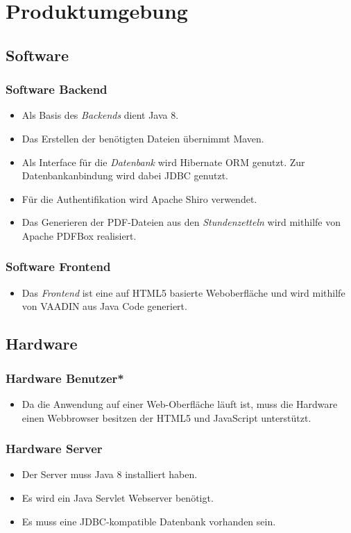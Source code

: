\section{Produktumgebung}

\subsection{Software}
\subsubsection{Software Backend}
\begin{itemize}
    \item Als Basis des \emph{Backends} dient Java 8.
    \item Das Erstellen der benötigten Dateien übernimmt Maven.
    \item Als Interface für die \emph{Datenbank} wird Hibernate ORM genutzt.
            Zur Datenbankanbindung wird dabei JDBC genutzt.
    \item Für die Authentifikation wird Apache Shiro verwendet.
    \item Das Generieren der PDF-Dateien aus den \emph{Stundenzetteln} wird mithilfe von Apache PDFBox realisiert.
\end{itemize}

\subsubsection{Software Frontend}
\begin{itemize}
    \item Das \emph{Frontend} ist eine auf HTML5 basierte Weboberfläche und wird mithilfe von VAADIN aus Java Code generiert.
\end{itemize}

\subsection{Hardware}
\subsubsection{Hardware Benutzer*}
\begin{itemize}
    \item Da die Anwendung auf einer Web-Oberfläche läuft ist, muss die Hardware einen Webbrowser besitzen der HTML5 und JavaScript unterstützt.
\end{itemize}

\subsubsection{Hardware Server}
\begin{itemize}
    \item Der Server muss Java 8 installiert haben.
    \item Es wird ein Java Servlet Webserver benötigt.
    \item Es muss eine JDBC-kompatible Datenbank vorhanden sein.
\end{itemize}
